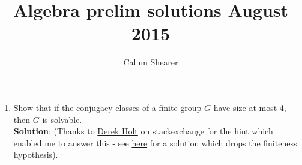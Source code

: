 \documentclass[12pt]{extarticle}
\title{Algebra prelim solutions August 2015}
\author{Calum Shearer}
\begin{document}
\maketitle

\begin{enumerate}[1)]
    \item Show that if the conjugacy classes of a finite group \(G\) have size at most 4, then \(G\) is solvable. \\
    
    \textbf{Solution}: (Thanks to \href{https://math.stackexchange.com/users/2820/derek-holt}{Derek Holt} on stackexchange for the hint which enabled me to answer this - see \href{https://math.stackexchange.com/a/4208528/870855}{here} for a solution which drops the finiteness hypothesis). \\
    

\end{enumerate}
\end{document}
